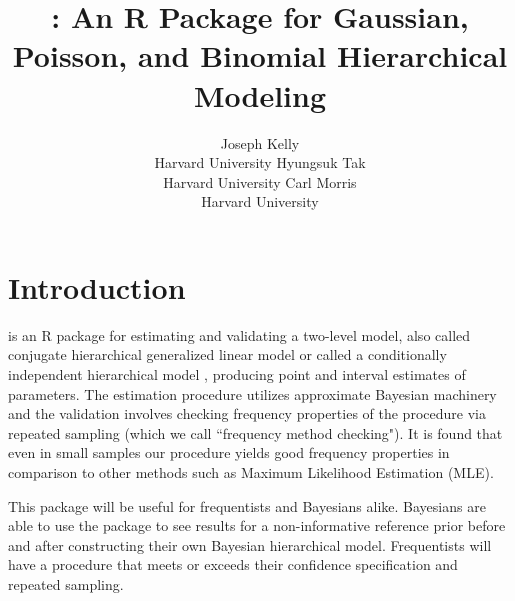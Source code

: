 \documentclass[article]{jss}
\author{Joseph Kelly\\Harvard University \And 
             Hyungsuk Tak\\Harvard University\And
             Carl Morris\\ Harvard University}
\title{\pkg{Rgbp}: An R Package for Gaussian, Poisson, and Binomial Hierarchical Modeling}
\begin{document}

\section[introduction]{Introduction}
 is an R package for estimating and validating a two-level model, also called conjugate hierarchical generalized linear model \citep{hglm2006, hglm2010} or called a conditionally independent hierarchical model \citep{1989}, producing point and interval estimates of  parameters. The estimation procedure utilizes approximate Bayesian machinery and the validation involves checking frequency properties of the procedure via repeated sampling (which we call ``frequency method checking"). It is found that even in small samples our procedure yields good frequency properties in comparison to other methods such as Maximum Likelihood Estimation (MLE). 

This package will be useful for frequentists and Bayesians alike. Bayesians are able to use the package to see results for a non-informative reference prior before and after constructing their own Bayesian hierarchical model. Frequentists will have a procedure that meets or exceeds their confidence specification and repeated sampling.



\end{document}
